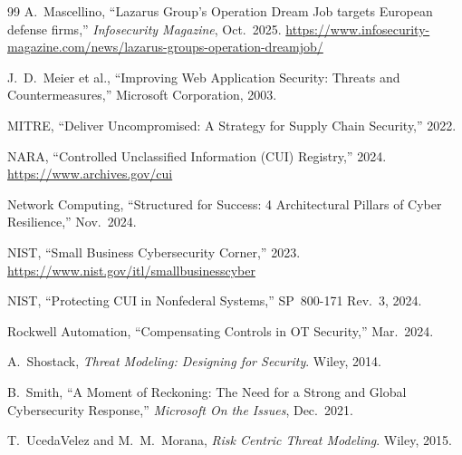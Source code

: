 \documentclass[sigconf,nonacm]{acmart}
\begin{document}
\begin{thebibliography}{99}
A.~Mascellino, ``Lazarus Group's Operation Dream Job targets European defense firms,''
\textit{Infosecurity Magazine}, Oct.~2025.
\url{https://www.infosecurity-magazine.com/news/lazarus-groups-operation-dreamjob/}

J.~D.~Meier et al., ``Improving Web Application Security: Threats and Countermeasures,''
Microsoft Corporation, 2003.

MITRE, ``Deliver Uncompromised: A Strategy for Supply Chain Security,'' 2022.

NARA, ``Controlled Unclassified Information (CUI) Registry,'' 2024.
\url{https://www.archives.gov/cui}

Network Computing, ``Structured for Success: 4 Architectural Pillars of Cyber
Resilience,'' Nov.~2024.

NIST, ``Small Business Cybersecurity Corner,'' 2023.
\url{https://www.nist.gov/itl/smallbusinesscyber}

NIST, ``Protecting CUI in Nonfederal Systems,'' SP~800-171 Rev.~3, 2024.

Rockwell Automation, ``Compensating Controls in OT Security,'' Mar.~2024.

A.~Shostack, \textit{Threat Modeling: Designing for Security}. Wiley, 2014.

B.~Smith, ``A Moment of Reckoning: The Need for a Strong and Global Cybersecurity
Response,'' \textit{Microsoft On the Issues}, Dec.~2021.

T.~UcedaVelez and M.~M.~Morana, \textit{Risk Centric Threat Modeling}. Wiley, 2015.

\end{thebibliography}
\end{document}

